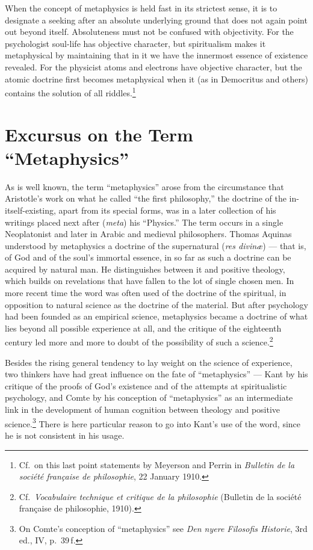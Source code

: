 \documentclass[12pt]{book}
\newcommand{\opage}[1]{\marginnote{\footnotesize\textit{[#1]}}}
\begin{document}
When the concept of metaphysics is held fast in its strictest sense, it is to designate a seeking after an
absolute underlying ground that does not again point out beyond itself. Absoluteness must not be confused
with objectivity. For the psychologist soul-life has objective character, but spiritualism makes it
metaphysical by maintaining that in it we have the innermost essence of existence revealed. For the
physicist atoms and electrons have objective character, but the atomic doctrine first becomes metaphysical
when it (as in Democritus and others) contains the solution of all riddles.\footnote{Cf.\ on this last
point statements by Meyerson and Perrin in \textit{Bulletin de la société française de philosophie}, 22
January 1910.}

\section*{Excursus on the Term ``Metaphysics''}

As is well known, the term ``metaphysics'' arose from the circumstance that Aristotle's work on what he
called ``the first philosophy,'' the doctrine of the in-itself-existing, apart from its special forms, was in
a later collection of his writings placed next after (\textit{meta}) his ``Physics.'' The term occurs in a
single Neoplatonist and later in Arabic and medieval philosophers. Thomas Aquinas understood by metaphysics
a doctrine of the supernatural (\textit{res divinæ}) --- that is, of God and of the soul's immortal essence,
in so far as such a doctrine can be acquired by natural man. He distinguishes between it and positive
theology, which \opage{86}builds on revelations that have fallen to the lot of single chosen men. In more recent time
the word was often used of the doctrine of the spiritual, in opposition to natural science as the doctrine
of the material. But after psychology had been founded as an empirical science, metaphysics became a
doctrine of what lies beyond all possible experience at all, and the critique of the eighteenth century led
more and more to doubt of the possibility of such a science.\footnote{Cf.\ \textit{Vocabulaire technique et
critique de la philosophie} (Bulletin de la société française de philosophie, 1910).}

Besides the rising general tendency to lay weight on the science of experience, two thinkers have had great
influence on the fate of ``metaphysics'' --- Kant by his critique of the proofs of God's existence and of
the attempts at spiritualistic psychology, and Comte by his conception of ``metaphysics'' as an intermediate
link in the development of human cognition between theology and positive science.\footnote{On Comte's
conception of ``metaphysics'' see \textit{Den nyere Filosofis Historie}, 3rd ed., IV, p.\ 39\,f.} There is
here particular reason to go into Kant's use of the word, since he is not consistent in his usage.
\end{document}
